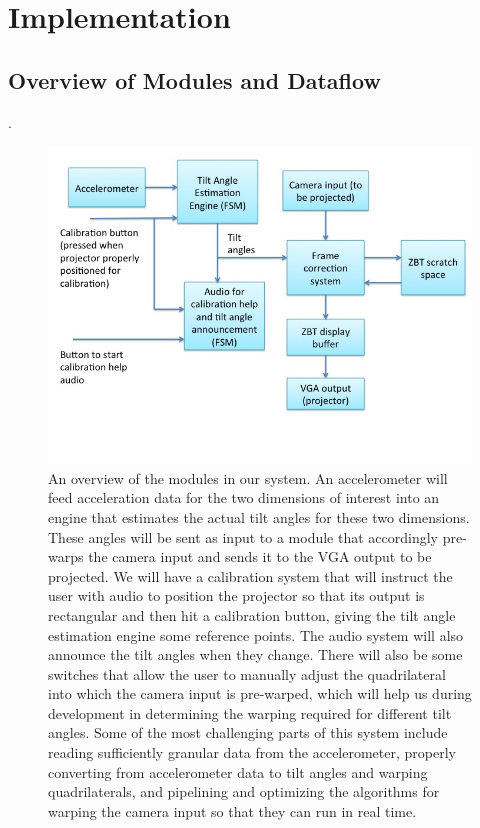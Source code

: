 \documentclass{article}
\begin{document}
\section{Implementation}

\subsection{Overview of Modules and Dataflow}
. 
\begin{figure}
\centering
\includegraphics[width=\textwidth]{img/block_diag}
\caption{An overview of the modules in our system. An accelerometer will feed acceleration data for the two dimensions of interest into an engine that estimates the actual tilt angles for these two dimensions. These angles will be sent as input to a module that accordingly pre-warps the camera input and sends it to the VGA output to be projected. We will have a calibration system that will instruct the user with audio to position the projector so that its output is rectangular and then hit a calibration button, giving the tilt angle estimation engine some reference points. The audio system will also announce the tilt angles when they change. There will also be some switches that allow the user to manually adjust the quadrilateral into which the camera input is pre-warped, which will help us during development in determining the warping required for different tilt angles. Some of the most challenging parts of this system include reading sufficiently granular data from the accelerometer, properly converting from accelerometer data to tilt angles and warping quadrilaterals, and pipelining and optimizing the algorithms for warping the camera input so that they can run in real time.}
\end{figure}
\end{document}
